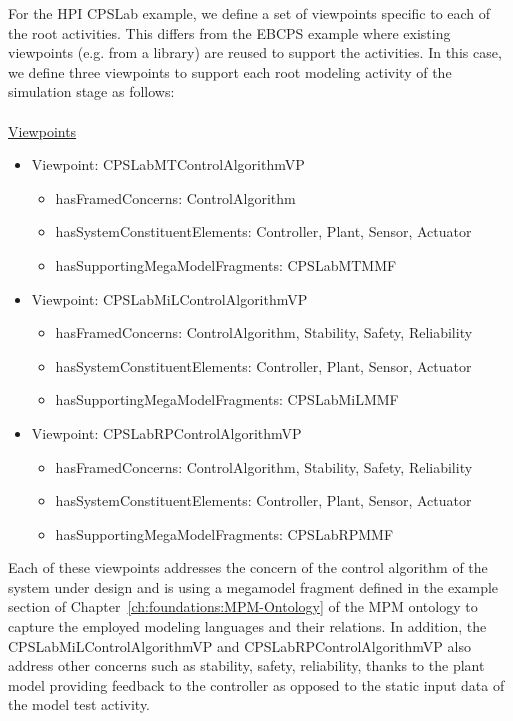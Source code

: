 For the HPI CPSLab example, we define a set of viewpoints specific to each of the root activities. This differs from the EBCPS example where existing viewpoints (e.g. from a library) are reused to support the activities. In this case, we define three viewpoints to support each root modeling activity of the simulation stage as follows:
\\
\\
\noindent\uline{Viewpoints}
    \begin{itemize}
         \item Viewpoint: CPSLabMTControlAlgorithmVP
         \begin{itemize}
            \item hasFramedConcerns: ControlAlgorithm
            \item hasSystemConstituentElements: Controller, Plant, Sensor, Actuator
            \item hasSupportingMegaModelFragments: CPSLabMTMMF
         \end{itemize}
        \item Viewpoint: CPSLabMiLControlAlgorithmVP
         \begin{itemize}
            \item hasFramedConcerns: ControlAlgorithm, Stability, Safety, Reliability
            \item hasSystemConstituentElements: Controller, Plant, Sensor, Actuator
            \item hasSupportingMegaModelFragments: CPSLabMiLMMF
         \end{itemize}
        \item Viewpoint: CPSLabRPControlAlgorithmVP
         \begin{itemize}
            \item hasFramedConcerns: ControlAlgorithm, Stability, Safety, Reliability
            \item hasSystemConstituentElements: Controller, Plant, Sensor, Actuator
            \item hasSupportingMegaModelFragments: CPSLabRPMMF
         \end{itemize}
    \end{itemize}

Each of these viewpoints addresses the concern of the control algorithm of the system under design and is using a megamodel fragment defined in the example section of Chapter~\ref{ch:foundations:MPM-Ontology} of the MPM ontology to capture the employed modeling languages and their relations. In addition, the CPSLabMiLControlAlgorithmVP and CPSLabRPControlAlgorithmVP also address other concerns such as stability, safety, reliability, thanks to the plant model providing feedback to the controller as opposed to the static input data of the model test activity.

